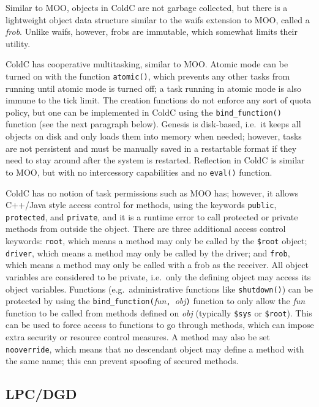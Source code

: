 \documentclass{article}
\begin{document}
Similar to MOO, objects in ColdC are not garbage collected, but there
is a lightweight object data structure similar to the waifs extension
to MOO, called a \emph{frob}.  Unlike waifs, however, frobs are
immutable, which somewhat limits their utility.

ColdC has cooperative multitasking, similar to MOO.  Atomic mode can
be turned on with the function \texttt{atomic()}, which prevents any
other tasks from running until atomic mode is turned off; a task
running in atomic mode is also immune to the tick limit.  The creation
functions do not enforce any sort of quota policy, but one can be
implemented in ColdC using the \texttt{bind\_function()} function (see
the next paragraph below).  Genesis is disk-based, i.e.~it keeps all
objects on disk and only loads them into memory when needed; however,
tasks are not persistent and must be manually saved in a restartable
format if they need to stay around after the system is restarted.
Reflection in ColdC is similar to MOO, but with no intercessory
capabilities and no \texttt{eval()} function.

ColdC has no notion of task permissions such as MOO has; however, it
allows C++/Java style access control for methods, using the keywords
\texttt{public}, \texttt{protected}, and \texttt{private}, and it is a 
runtime error to call protected or private methods from outside the
object.  There are three additional access control keywords:
\texttt{root}, which means a method may only be called by the
\texttt{\$root} object; \texttt{driver}, which means a method may only
be called by the driver; and \texttt{frob}, which means a method may
only be called with a frob as the receiver.  All object variables are
considered to be private, i.e.~only the defining object may access its 
object variables.  Functions (e.g.~administrative functions like
\texttt{shutdown()}) can be
protected by using the \texttt{bind\_function(}\textit{fun}\texttt{,
}\textit{obj}\texttt{)} function to only allow the \textit{fun}
function to be called from methods defined on \textit{obj} (typically
\texttt{\$sys} or \texttt{\$root}).  This can be used to force access
to functions to go through methods, which can impose extra security or
resource control measures.  A method may also be set
\texttt{nooverride}, which means that no descendant object may define a 
method with the same name; this can prevent spoofing of secured
methods.

\subsection{LPC/DGD}
\end{document}
